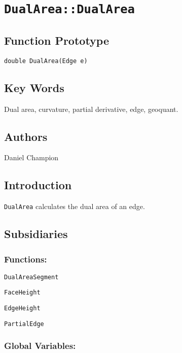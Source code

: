                       

\section*{\texttt{DualArea::DualArea}}

\subsection*{Function Prototype}

\texttt{double DualArea(Edge e)}

\subsection*{Key Words}

Dual area, curvature, partial derivative, edge, geoquant.

\subsection*{Authors}

Daniel Champion

\subsection*{Introduction}

\texttt{DualArea} calculates the dual area of an edge.

\subsection*{Subsidiaries}

\subsubsection*{Functions: \ }

\qquad \texttt{DualAreaSegment}

\qquad \qquad \texttt{FaceHeight}

\qquad \qquad \qquad \texttt{EdgeHeight}

\qquad \qquad \qquad \qquad \texttt{PartialEdge}

\subsubsection*{Global Variables: \ }

